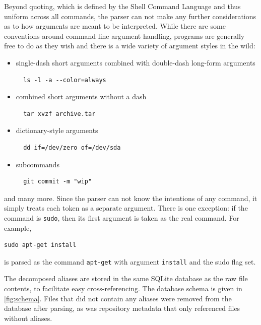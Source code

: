 Beyond quoting, which is defined by the Shell Command Language and thus uniform across all commands, the parser can not make any further considerations as to how arguments are meant to be interpreted.
While there are some conventions around command line argument handling, programs are generally free to do as they wish and there is a wide variety of argument styles in the wild:
\begin{itemize}
    \item single-dash short arguments combined with double-dash long-form arguments 
        \begin{verbatim}  ls -l -a --color=always\end{verbatim}
    \item combined short arguments without a dash 
        \begin{verbatim}  tar xvzf archive.tar\end{verbatim}
    \item dictionary-style arguments 
        \begin{verbatim}  dd if=/dev/zero of=/dev/sda\end{verbatim}
    \item subcommands
        \begin{verbatim}  git commit -m "wip"\end{verbatim}
\end{itemize}
and many more.
Since the parser can not know the intentions of any command, it simply treats each token as a separate argument.
There is one exception: if the command is \texttt{sudo}, then its first argument is taken as the real command. 
For example,
\begin{verbatim}
sudo apt-get install
\end{verbatim} 
is parsed as the command \texttt{apt-get} with argument \texttt{install} and the sudo flag set.

The decomposed aliases are stored in the same SQLite database as the raw file contents, to facilitate easy cross-referencing.
The database schema is given in \cref{fig:schema}.
Files that did not contain any aliases were removed from the database after parsing, as was repository metadata that only referenced files without aliases.

